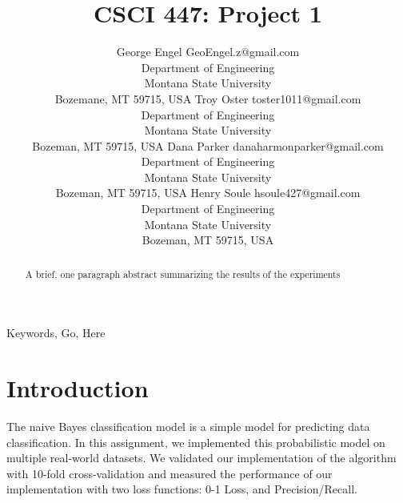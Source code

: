 \documentclass[twoside,11pt]{article}
\begin{document}
\title{CSCI 447: Project 1}

\author{\name George Engel \email GeoEngel.z@gmail.com \\
       \addr Department of Engineering\\
       Montana State University\\
       Bozemane, MT 59715, USA
       \AND
       \name Troy Oster \email toster1011@gmail.com \\
       \addr Department of Engineering\\
       Montana State University\\
       Bozeman, MT 59715, USA
       \AND
       \name Dana Parker \email danaharmonparker@gmail.com \\
       \addr Department of Engineering\\
       Montana State University\\
       Bozeman, MT 59715, USA
       \AND
       \name Henry Soule \email hsoule427@gmail.com \\
       \addr Department of Engineering\\
       Montana State University\\
       Bozeman, MT 59715, USA}


\maketitle

\begin{abstract}%

A brief, one paragraph abstract summarizing the results of the experiments

\end{abstract}

\begin{keywords}
    Keywords, Go, Here
\end{keywords}

\section{Introduction}
The naive Bayes classification model is a simple model for predicting data classification. In this assignment, we implemented this probabilistic model on multiple real-world datasets. We validated our implementation of the algorithm with 10-fold cross-validation and measured the performance of our implementation with two loss functions: 0-1 Loss, and Precision/Recall.
\end{document}
